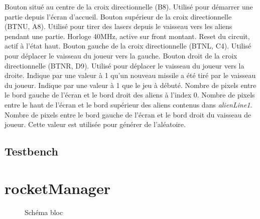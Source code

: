 \documentclass[french]{nakrule}
\begin{document}
\begin{descr}
   Bouton situé au centre de la croix directionnelle (B8).
  Utilisé pour démarrer une partie depuis l'écran d'accueil.
   Bouton supérieur de la croix directionnelle (BTNU, A8).
  Utilisé pour tirer des lasers depuis le vaisseau vers les aliens pendant une partie.
   Horloge 40MHz, active sur front montant.
   Reset du circuit, actif à l'état haut.
   Bouton gauche de la croix directionnelle (BTNL, C4). Utilisé
  pour déplacer le vaisseau du joueur vers la gauche.
   Bouton droit de la croix directionnelle (BTNR, D9). Utilisé
  pour déplacer le vaisseau du joueur vers la droite.
   Indique par une valeur à 1 qu'un nouveau missile a été
  tiré par le vaisseau du joueur.
   Indique par une valeur à 1 que le jeu à débuté.
   Nombre de pixels entre le bord gauche de l'écran et le
  bord droit des aliens à l'index 0.
   Nombre de pixels entre le haut de l'écran et le bord
  supérieur des aliens contenus dans \emph{alienLine1}.
   Nombre de pixels entre le bord gauche de l'écran et
  le bord droit du vaisseau de joueur. Cette valeur est utilisée pour générer de l'aléatoire.
\end{descr}

\subsection{Testbench}
\label{subsec:Testbench_input}



\clearpage

\section{rocketManager}
\label{sec:rocketmanager}

\begin{figure}
\caption{Schéma bloc}
\label{rocketManagerBloc}
\end{figure}
\end{document}
